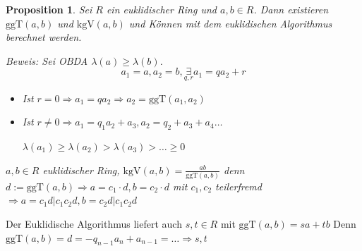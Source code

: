 \documentclass{article}
\newtheorem{proposition}[thm]{Proposition}
\newcommand{\ggT}{\text{ggT}}
\newcommand{\kgV}{\text{kgV}}
\begin{document}
\begin{proposition}
    Sei $R$ ein euklidischer Ring und $a,b\in R$.
    Dann existieren $\ggT(a,b)$ und $\kgV(a,b)$
    und Können mit dem euklidischen Algorithmus
    berechnet werden.

    Beweis:
    Sei OBDA $\lambda(a)\geq\lambda(b)$.
    \begin{equation*}
        a_1=a,a_2=b,\underset{q,r}\exists a_1=qa_2+r
    \end{equation*}
    \begin{itemize}
        \item
            Ist $r=0\Rightarrow a_1=qa_2\Rightarrow
            a_2=\ggT(a_1,a_2)$
        \item
            Ist $r\neq 0\Rightarrow
            a_1=q_1a_2+a_3,a_2=q_2+a_3+a_4\hdots$

            $\lambda(a_1)\geq\lambda(a_2)>\lambda(a_3)
            >\hdots\geq 0$
    \end{itemize}
    $a,b\in R$ euklidischer Ring,
    $\kgV(a,b)=\frac{ab}{\ggT(a,b)}$
    denn
    $d:=\ggT(a,b)\Rightarrow a=c_1\cdot d,b=c_2\cdot d$
    mit $c_1,c_2$ teilerfremd $\Rightarrow a=c_1d|c_1c_2d,
    b=c_2d|c_1c_2d$
\end{proposition}
Der Euklidische Algorithmus liefert auch $s,t\in R$ mit
$\ggT(a,b)=sa+tb$ Denn\\
$\ggT(a,b)=d=-q_{n-1}a_n+a_{n-1}=\hdots\Rightarrow s,t$
\end{document}
